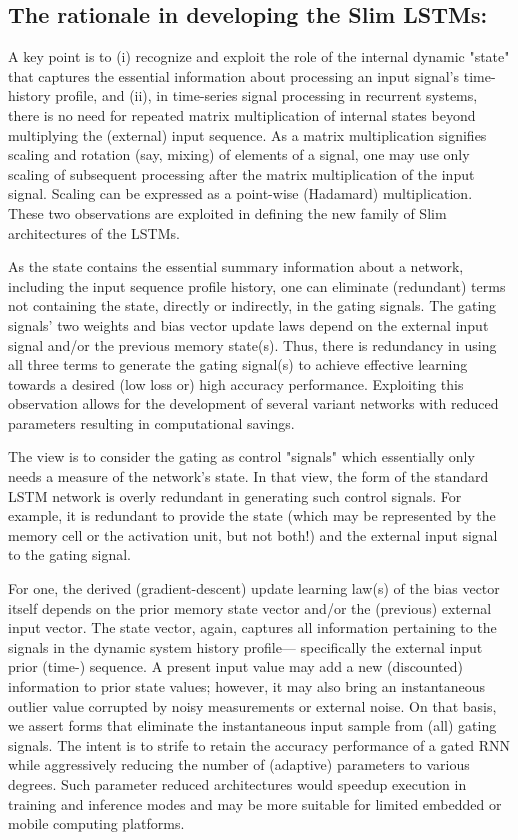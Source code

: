 \documentclass{article}
\begin{document}
\subsection{The rationale in developing the Slim LSTMs:}

A key point is to (i) recognize and exploit the role of the internal dynamic "state" that captures the essential information about processing an input signal's time-history profile, and (ii), in time-series signal processing in recurrent systems, there is no need for repeated matrix multiplication of internal states beyond multiplying the (external) input sequence. As a matrix multiplication signifies scaling and rotation (say, mixing) of elements of a signal, one may use only scaling  of subsequent processing after the matrix multiplication of the input signal. Scaling can be expressed as a point-wise (Hadamard) multiplication. These two observations are exploited in defining the new family of Slim architectures of the LSTMs.

As the state contains the essential summary information about a network, including the input sequence profile history, one can eliminate (redundant) terms not containing the state, directly or indirectly, in the gating signals. The gating signals' two weights and bias vector update laws depend on the external input signal and/or the previous memory state(s). Thus, there is redundancy in using all three terms to generate the gating signal(s) to achieve effective learning towards a desired (low loss or) high accuracy performance. Exploiting this observation allows for the development of several variant networks with reduced parameters resulting in computational savings.

The view is to consider the gating as control "signals" which essentially only needs a measure of the network's state. In that view, the form of the standard LSTM network is overly redundant in generating such control signals. For example, it is redundant to provide the state (which may be represented by the memory cell or the activation unit, but not both!) and the external input signal to the gating  signal.

For one, the derived (gradient-descent) update learning law(s) of the bias vector itself depends on the prior memory state vector and/or the (previous) external input vector. The state vector, again, captures all information pertaining to the signals in the dynamic system history profile--- specifically the external input prior (time-) sequence. A present input value may add a new (discounted)  information to prior state values; however, it may also bring an instantaneous outlier value corrupted by noisy measurements or external noise. On that basis, we assert forms that eliminate the instantaneous input sample from (all) gating signals. The intent is to strife to retain the accuracy performance of a gated RNN while aggressively reducing the number of (adaptive) parameters to various degrees. Such parameter reduced architectures would speedup execution in training and inference modes and may be more suitable for limited embedded or mobile computing platforms.
\end{document}
